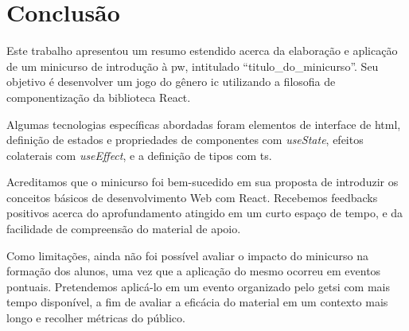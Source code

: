 \section{Conclusão}%
\label{sec:conclusao}

Este trabalho apresentou um resumo estendido acerca da elaboração e aplicação de um minicurso de introdução à \gls{pw}, intitulado ``\gls{titulo_do_minicurso}''.
Seu objetivo é desenvolver um jogo do gênero \gls{ic} utilizando a filosofia de componentização da biblioteca React.

Algumas tecnologias específicas abordadas foram elementos de interface de \gls{html}, definição de estados e propriedades de componentes com \textit{useState}, efeitos colaterais com \textit{useEffect}, e a definição de tipos com \gls{ts}.

Acreditamos que o minicurso foi bem-sucedido em sua proposta de introduzir os conceitos básicos de desenvolvimento Web com React.
Recebemos feedbacks positivos acerca do aprofundamento atingido em um curto espaço de tempo, e da facilidade de compreensão do material de apoio.

Como limitações, ainda não foi possível avaliar o impacto do minicurso na formação dos alunos, uma vez que a aplicação do mesmo ocorreu em eventos pontuais.
Pretendemos aplicá-lo em um evento organizado pelo \gls{getsi} com mais tempo disponível, a fim de avaliar a eficácia do material em um contexto mais longo e recolher métricas do público.
